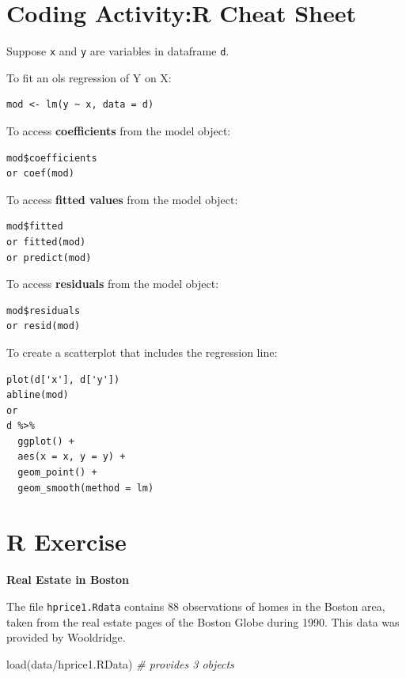 \documentclass[
]{book}
\newenvironment{Shaded}{\begin{snugshade}}{\end{snugshade}}
\newcommand{\CommentTok}[1]{\textcolor[rgb]{0.56,0.35,0.01}{\textit{#1}}}
\newcommand{\FunctionTok}[1]{\textcolor[rgb]{0.00,0.00,0.00}{#1}}
\newcommand{\NormalTok}[1]{#1}
\newcommand{\StringTok}[1]{\textcolor[rgb]{0.31,0.60,0.02}{#1}}
\theoremstyle{definition}
\theoremstyle{definition}
\theoremstyle{definition}
\theoremstyle{definition}
\theoremstyle{remark}
\begin{document}
\hypertarget{coding-activityr-cheat-sheet}{%
\section{Coding Activity:R Cheat Sheet}\label{coding-activityr-cheat-sheet}}

Suppose \texttt{x} and \texttt{y} are variables in dataframe \texttt{d}.

To fit an ols regression of Y on X:

\begin{verbatim}
mod <- lm(y ~ x, data = d)
\end{verbatim}

To access \textbf{coefficients} from the model object:

\begin{verbatim}
mod$coefficients
or coef(mod)
\end{verbatim}

To access \textbf{fitted values} from the model object:

\begin{verbatim}
mod$fitted
or fitted(mod)
or predict(mod)
\end{verbatim}

To access \textbf{residuals} from the model object:

\begin{verbatim}
mod$residuals
or resid(mod)
\end{verbatim}

To create a scatterplot that includes the regression line:

\begin{verbatim}
plot(d['x'], d['y'])
abline(mod)
or 
d %>% 
  ggplot() + 
  aes(x = x, y = y) + 
  geom_point() + 
  geom_smooth(method = lm)
\end{verbatim}

\hypertarget{r-exercise}{%
\section{R Exercise}\label{r-exercise}}

\textbf{Real Estate in Boston}

The file \texttt{hprice1.Rdata} contains 88 observations of homes in the Boston area, taken from the real estate pages of the Boston Globe during 1990. This data was provided by Wooldridge.

\begin{Shaded}
\begin{Highlighting}[]
\FunctionTok{load}\NormalTok{(}\StringTok{\textquotesingle{}data/hprice1.RData\textquotesingle{}}\NormalTok{) }\CommentTok{\# provides 3 objects }
\end{Highlighting}
\end{Shaded}
\end{document}
